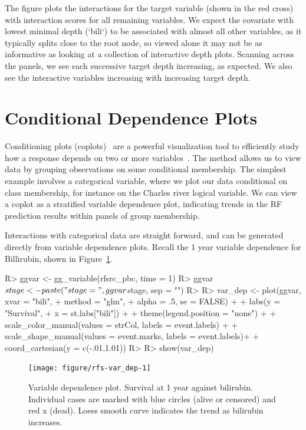 \documentclass[nojss]{jss}\usepackage[]{graphicx}\usepackage[]{color}
\begin{document}
The  figure plots the interactions for the target variable (shown in the red cross) with interaction scores for all remaining variables. We expect the covariate with lowest minimal depth (`bili`) to be associated with almost all other variables, as it typically splits close to the root node, so viewed alone it may not be as informative as looking at a collection of interactive depth plots. Scanning across the panels, we see each successive target depth increasing, as expected. We also see the interactive variables increasing with increasing target depth. 

\section{Conditional Dependence Plots}\label{S:coplots}

Conditioning plots (coplots)~\citep{chambers:1992,cleveland:1993}  are a powerful visualization tool to efficiently study how a response depends on two or more variables~\citep{cleveland:1993}. The method allows us to view data by grouping observations on some conditional membership. The simplest example involves a categorical variable, where we plot our data conditional on class membership, for instance on the Charles river logical variable. We can view a coplot as a stratified variable dependence plot, indicating trends in the RF prediction results within panels of group membership.

Interactions with categorical data are straight forward, and can be generated directly from variable dependence plots. Recall the 1 year variable dependence for Billirubin, shown in Figure~\ref{fig:var_dep}. 
\begin{Schunk}
\begin{Sinput}
R> ggvar <- gg_variable(rfsrc_pbc, time = 1)
R> ggvar$stage <- paste("stage = ", ggvar$stage, sep = "")
R> 
R> var_dep <- plot(ggvar, xvar = "bili", 
+                 method = "glm",
+                 alpha = .5, se = FALSE) + 
+   labs(y = "Survival", 
+        x = st.labs["bili"]) + 
+   theme(legend.position = "none") + 
+   scale_color_manual(values = strCol, labels = event.labels) + 
+   scale_shape_manual(values = event.marks, labels = event.labels)+
+   coord_cartesian(y = c(-.01,1.01))
R> 
R> show(var_dep)
\end{Sinput}
\begin{figure}[!htpb]

{\centering \texttt{[image: figure/rfs-var\_dep-1]} 

}

\caption[Variable dependence plot]{Variable dependence plot. Survival at 1 year against bilirubin. Individual cases are marked with blue circles (alive or censored) and red x (dead). Loess smooth curve indicates the trend as bilirubin  increases.\label{fig:var_dep}}
\end{figure}
\end{Schunk}
\end{document}

